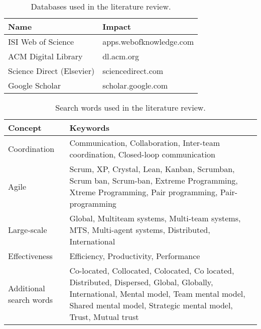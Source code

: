 \begin{table}[H]
\begin{center}
    \begin{tabular}{ | p{5cm} | p{8cm} |}
    \hline
    \textbf{Name} & \textbf{Impact} \\ \hline
    ISI Web of Science & apps.webofknowledge.com \\ \hline
    ACM Digital Library & dl.acm.org  \\ \hline
    Science Direct (Elsevier) & sciencedirect.com \\ \hline
    Google Scholar & scholar.google.com \\ \hline
    \end{tabular}
    \caption{Databases used in the literature review.}
    \label{databases}
\end{center}
\end{table}

\begin{table}[H]
\begin{center}
    \begin{tabular}{ | p{5cm} | p{8cm} |}
    \hline
    \textbf{Concept} & \textbf{Keywords} \\ \hline
    Coordination & Communication, Collaboration, Inter-team coordination, Closed-loop communication \\ \hline
    Agile & Scrum, XP, Crystal, Lean, Kanban, Scrumban, Scrum ban, Scrum-ban, Extreme Programming, Xtreme Programming, Pair programming, Pair-programming  \\ \hline
    Large-scale & Global, Multiteam systems, Multi-team systems, MTS, Multi-agent systems, Distributed, International \\ \hline
    Effectiveness & Efficiency, Productivity, Performance \\ \hline
    Additional search words & Co-located, Collocated, Colocated, Co located, Distributed, Dispersed, Global, Globally, International, Mental model, Team mental model, Shared mental model, Strategic mental model, Trust, Mutual trust \\ \hline
    \end{tabular}
    \caption{Search words used in the literature review.}
    \label{searchwords}
\end{center}
\end{table}

